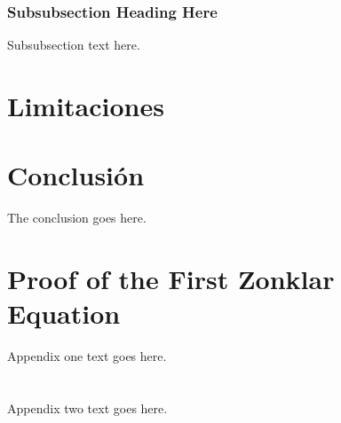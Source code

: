 \documentclass[conference,onecolumn]{IEEEtran}
\begin{document}
\subsubsection{Subsubsection Heading Here}
Subsubsection text here.

\section{Limitaciones}

\section{Conclusión}
The conclusion goes here.

\appendices
\section{Proof of the First Zonklar Equation}
Appendix one text goes here.

\section{}
Appendix two text goes here.




\end{document}
